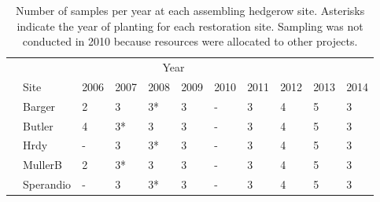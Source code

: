\documentclass[12pt]{article}
\begin{document}
\doublespacing
\linenumbers

\renewcommand{\thesection}{S\arabic{section}} \setcounter{section}{0}
\renewcommand{\theequation}{S\arabic{equation}}
\setcounter{equation}{0} \renewcommand{\thetable}{S\arabic{table}}
\setcounter{table}{0} %
\renewcommand{\thefigure}{S\arabic{figure}} \setcounter{figure}{0}
\setcounter{page}{1}

\newcommand{\lkmcomment}[1] {
  \textcolor{red}{\it{[#1]}}
}


\begin{table}
  \renewcommand*\arraystretch{1.25}
  \centering
  \caption{Number of samples per year at each assembling hedgerow site. Asterisks indicate
    the year of planting for each restoration site. Sampling was not
    conducted in 2010 because resources were allocated to other
    projects.} 
  \begin{tabular}{lllllllllll}
    \hline
    \multicolumn{10}{c}{\hspace{10em}Year}\\
    & Site & 2006 & 2007 & 2008 & 2009 & 2010 & 2011 & 2012 & 2013 & 2014\\
    \hline
    &Barger & 2 & 3 & 3* & 3 & - & 3 & 4 & 5 & 3 \\
    &Butler & 4 & 3* & 3 & 3 & - & 3 & 4 & 5 & 3 \\ 
    &Hrdy & - & 3 & 3* & 3 & - & 3 & 4 & 5 & 3 \\
    &MullerB & 2 & 3* & 3 & 3 & - & 3 & 4 & 5 & 3 \\
    &Sperandio & - & 3 & 3* & 3 & - & 3 & 4 & 5 & 3 \\
    \hline
  \end{tabular}
  \label{tab:maturing}
\end{table}
\clearpage
\end{document}
